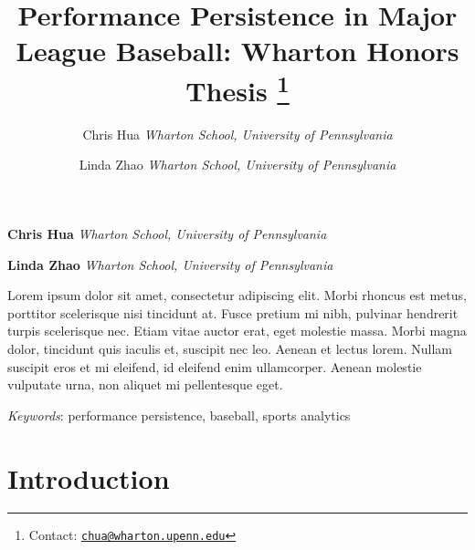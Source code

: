 \documentclass[11pt,]{article}
\title{Performance Persistence in Major League Baseball: Wharton Honors Thesis \thanks{Contact:
\href{mailto:chua@wharton.upenn.edu}{\nolinkurl{chua@wharton.upenn.edu}}}  }
\author{\Large Chris Hua\vspace{0.05in} \newline\normalsize\emph{Wharton School, University of Pennsylvania}   \and \Large Linda Zhao\vspace{0.05in} \newline\normalsize\emph{Wharton School, University of Pennsylvania}  }
\date{}
\newcommand*{\authorfont}{\fontfamily{pbk}\selectfont}
\renewenvironment{abstract}
 {{%
    \setlength{\leftmargin}{0mm}
    \setlength{\rightmargin}{\leftmargin}%
  }%
  \relax}
 {\endlist}
\begin{document}
  
%

{%
\setlength{\parindent}{0pt}
\thispagestyle{plain}
{\fontsize{18}{20}\selectfont\raggedright 
\maketitle  %

}

{
   \vskip 13.5pt\relax \normalsize\fontsize{11}{12} 
 \textbf{\authorfont Chris Hua} \hfill \emph{\small Wharton School, University of Pennsylvania}   \par  \textbf{\authorfont Linda Zhao} \hfill \emph{\small Wharton School, University of Pennsylvania}   

}

}







\begin{abstract}

    \hbox{\vrule height .2pt width 39.14pc}

    \vskip 8.5pt %

\noindent Lorem ipsum dolor sit amet, consectetur adipiscing elit. Morbi rhoncus
est metus, porttitor scelerisque nisi tincidunt at. Fusce pretium mi
nibh, pulvinar hendrerit turpis scelerisque nec. Etiam vitae auctor
erat, eget molestie massa. Morbi magna dolor, tincidunt quis iaculis et,
suscipit nec leo. Aenean et lectus lorem. Nullam suscipit eros et mi
eleifend, id eleifend enim ullamcorper. Aenean molestie vulputate urna,
non aliquet mi pellentesque eget.


\vskip 8.5pt \noindent \emph{Keywords}: performance persistence, baseball, sports analytics \par

    \hbox{\vrule height .2pt width 39.14pc}



\end{abstract}


\vskip 6.5pt

\noindent \onehalfspacing \section{Introduction}\label{introduction}
\end{document}
